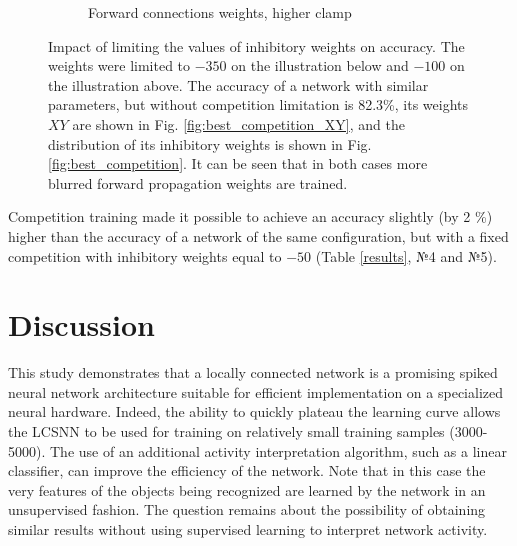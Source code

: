 \documentclass[a4paper,10pt]{article}
\begin{document}
\begin{figure}
\begin{subfigure}{0.45\textwidth}
    \caption{Forward connections weights, higher clamp}
\end{subfigure} 
\caption{Impact of limiting the values of inhibitory weights on accuracy. The weights were limited to $ -350 $ on the illustration below and $ -100 $ on the illustration above. The accuracy of a network with similar parameters, but without competition limitation is 82.3\%, its weights $ XY $ are shown in Fig. \ref {fig:best_competition_XY}, and the distribution of its inhibitory weights is shown in Fig. \ref{fig:best_competition}. It can be seen that in both cases more blurred forward propagation weights are trained.
}
\label{fig:compe_clamp}
\end{figure}

Competition training made it possible to achieve an accuracy slightly (by 2 \%) higher than the accuracy of a network of the same configuration, but with a fixed competition with inhibitory weights equal to $ -50 $ (Table \ref{results}, №4 and №5).

\section{Discussion}
This study demonstrates that a locally connected network is a promising spiked neural network architecture suitable for efficient implementation on a specialized neural hardware. Indeed, the ability to quickly plateau the learning curve allows the LCSNN to be used for training on relatively small training samples (3000-5000). The use of an additional activity interpretation algorithm, such as a linear classifier, can improve the efficiency of the network. Note that in this case the very features of the objects being recognized are learned by the network in an unsupervised fashion. The question remains about the possibility of obtaining similar results without using supervised learning to interpret network activity.
\end{document}
